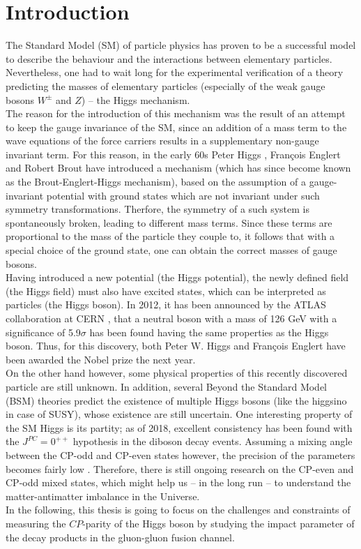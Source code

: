 \chapter{Introduction} %

\label{Chapter1} %

The Standard Model (SM) of particle physics has proven to be a successful model to describe the behaviour and the interactions between elementary particles. Nevertheless, one had to wait long for the experimental verification of a theory predicting the masses of elementary particles (especially of the weak gauge bosons $W^\pm$ and $Z$) -- the Higgs mechanism.\\
The reason for the introduction of this mechanism was the result of an attempt to keep the gauge invariance of the SM, since an addition of a mass term to the wave equations of the force carriers results in a supplementary non-gauge invariant term. For this reason, in the early 60s Peter Higgs \parencite{Reference1}, François Englert and Robert Brout \parencite{Reference2} have introduced a mechanism (which has since become known as the Brout-Englert-Higgs mechanism), based on the assumption of a gauge-invariant potential with ground states which are not invariant under such symmetry transformations. Therfore, the symmetry of a such system is spontaneously broken, leading to different mass terms. Since these terms are proportional to the mass of the particle they couple to, it follows that with a special choice of the ground state, one can obtain the correct masses of gauge bosons.\\
Having introduced a new potential (the Higgs potential), the newly defined field (the Higgs field) must also have excited states, which can be interpreted as particles (the Higgs boson). In 2012, it has been announced by the ATLAS collaboration at CERN \parencite{Reference3}, that a neutral boson with a mass of 126 GeV with a significance of 5.9$\sigma$ has been found having the same properties as the Higgs boson. Thus, for this discovery, both Peter W. Higgs and François Englert have been awarded the Nobel prize the next year.\\
On the other hand however, some physical properties of this recently discovered particle are still unknown. In addition, several Beyond the Standard Model (BSM) theories predict the existence of multiple Higgs bosons (like the higgsino in case of SUSY), whose existence are still uncertain. One interesting property of the SM Higgs is its partity; as of 2018, excellent consistency has been found with the $J^{PC} = 0^{++}$ hypothesis \parencite{PDG_source} in the diboson decay events. Assuming a mixing angle between the CP-odd and CP-even states however, the precision of the parameters becomes fairly low \parencite{PDG}. Therefore, there is still ongoing research on the CP-even and CP-odd mixed states, which might help us -- in the long run -- to understand the matter-antimatter imbalance in the Universe.\\
In the following, this thesis is going to focus on the challenges and constraints of measuring the $CP$-parity of the Higgs boson by studying the impact parameter of the decay products in the gluon-gluon fusion channel.\\